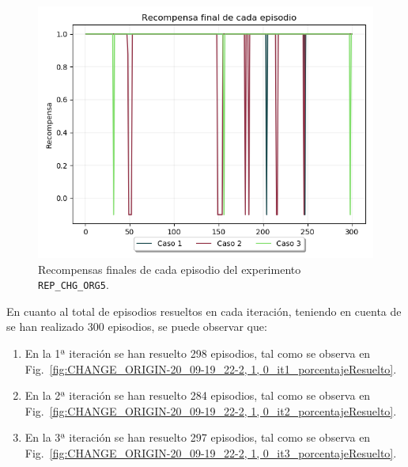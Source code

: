 \begin{figure}
    \centering
    \includegraphics[scale=0.4]{cap5_experimentacion/images/CHANGE_ORIGIN-20_09-19_22-2, 1, 0_recompensa.png}
    \caption{Recompensas finales de cada episodio del experimento \texttt{REP\_CHG\_ORG5}.}
    \label{fig:CHANGE_ORIGIN-20_09-19_22-2, 1, 0_recompensa}
\end{figure}

En cuanto al total de episodios resueltos en cada iteración, teniendo en cuenta de se han realizado 300 episodios, se puede observar que: 
\begin{enumerate}
    \item En la 1ª iteración se han resuelto 298 episodios, tal como se observa en Fig.~\ref{fig:CHANGE_ORIGIN-20_09-19_22-2, 1, 0_it1_porcentajeResuelto}.
    \item En la 2ª iteración se han resuelto 284 episodios, tal como se observa en Fig.~\ref{fig:CHANGE_ORIGIN-20_09-19_22-2, 1, 0_it2_porcentajeResuelto}.
    \item En la 3ª iteración se han resuelto 297 episodios, tal como se observa en Fig.~\ref{fig:CHANGE_ORIGIN-20_09-19_22-2, 1, 0_it3_porcentajeResuelto}.
\end{enumerate}

